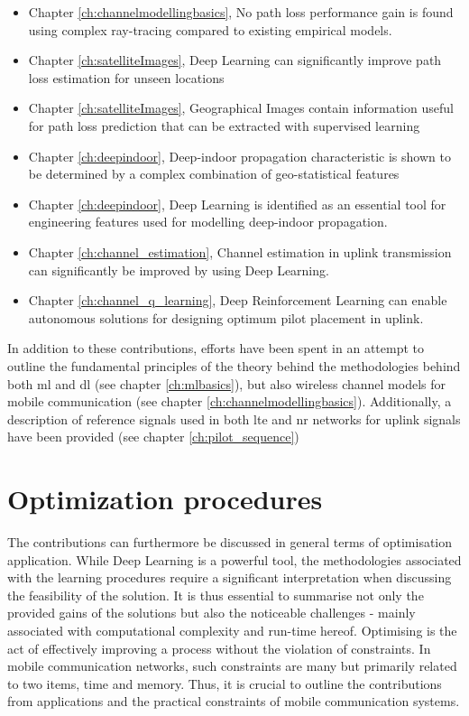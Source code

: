 \begin{itemize}
    \item Chapter \ref{ch:channelmodellingbasics}, No path loss performance gain is found using complex ray-tracing compared to existing empirical models.
    \item Chapter \ref{ch:satelliteImages}, Deep Learning can significantly improve path loss estimation for unseen locations
    \item Chapter \ref{ch:satelliteImages}, Geographical Images contain information useful for path loss prediction that can be extracted with supervised learning
    \item Chapter \ref{ch:deepindoor}, Deep-indoor propagation characteristic is shown to be determined by a complex combination of geo-statistical features
    \item Chapter \ref{ch:deepindoor}, Deep Learning is identified as an essential tool for engineering features used for modelling deep-indoor propagation.
    \item Chapter \ref{ch:channel_estimation}, Channel estimation in uplink transmission can significantly be improved by using Deep Learning.
    \item Chapter \ref{ch:channel_q_learning}, Deep Reinforcement Learning can enable autonomous solutions for designing optimum pilot placement in uplink.
\end{itemize}

In addition to these contributions, efforts have been spent in an attempt to outline the fundamental principles of the theory behind the methodologies behind both \acrfull{ml} and \acrfull{dl} (see chapter \ref{ch:mlbasics}), but also wireless channel models for mobile communication (see chapter \ref{ch:channelmodellingbasics}). Additionally, a description of reference signals used in both \gls{lte} and \gls{nr} networks for uplink signals have been provided (see chapter \ref{ch:pilot_sequence})


\section{Optimization procedures}
The contributions can furthermore be discussed in general terms of optimisation application. While Deep Learning is a powerful tool, the methodologies associated with the learning procedures require a significant interpretation when discussing the feasibility of the solution. It is thus essential to summarise not only the provided gains of the solutions but also the noticeable challenges - mainly associated with computational complexity and run-time hereof. Optimising is the act of effectively improving a process without the violation of constraints. In mobile communication networks, such constraints are many but primarily related to two items, time and memory. Thus, it is crucial to outline the contributions from applications and the practical constraints of mobile communication systems.

